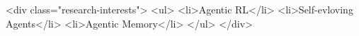 <div class="research-interests">
    <ul>
        <li>Agentic RL</li>
        <li>Self-evloving Agents</li>
        <li>Agentic Memory</li>
    </ul>
</div>